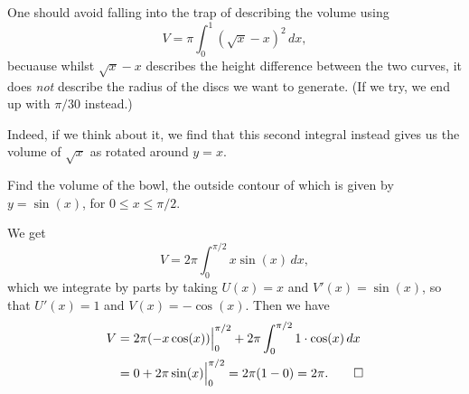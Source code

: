 \noindent
One should avoid falling into the trap of describing the volume using
\[
	V = \pi \int_0^1 (\sqrt{x} - x)^2 \, d x,
\]
becuause whilst $\sqrt{x} - x$ describes the height difference between the two curves, it does \emph{not} describe the radius of the discs we want to generate.
(If we try, we end up with $\pi / 30$ instead.)

Indeed, if we think about it, we find that this second integral instead gives us the volume of $\sqrt{x}$ as rotated around $y = x$.

\begin{example}
	Find the volume of the bowl, the outside contour of which is given by $y = \sin(x)$, for $0 \leq x \leq \pi/2$.

	We get
	\[
		V = 2 \pi \int_0^{\pi/2} x \sin(x) \, d x,
	\]
	which we integrate by parts by taking $U(x) = x$ and $V'(x) = \sin(x)$, so that $U'(x) = 1$ and $V(x) = - \cos(x)$.
	Then we have
	\begin{align*}
		V &= 2 \pi (- x \cos(x)) \Big \rvert_0^{\pi/2} + 2 \pi \int_0^{\pi/2} 1 \cdot \cos(x) \, d x \\
		  &= 0 + 2 \pi \sin(x) \Big \rvert_0^{\pi/2} = 2 \pi (1 - 0) = 2 \pi. \qedhere
	\end{align*}
\end{example}
